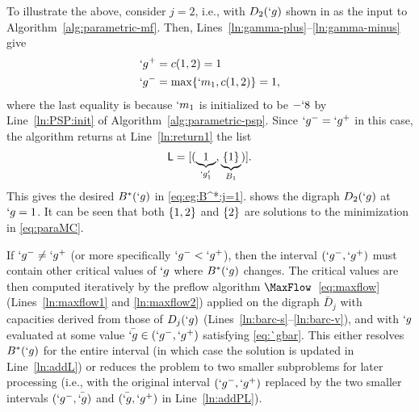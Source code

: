 \documentclass[conference,letterpaper]{IEEEtran}
\begin{document}
To illustrate the above, consider $j=2$, i.e., with $D_{2}(`g)$ shown in  as the input to
Algorithm~\ref{alg:parametric-mf}.
Then, Lines~\ref{ln:gamma-plus}--\ref{ln:gamma-minus} give
\begin{align*}
	`g^+&=c(1,2)=1\\
	`g^-&=\max\{`m_1,c(1,2)\}=1,
\end{align*} 
where the last equality is because $`m_1$ is initialized to be $-`8$ by Line~\ref{ln:PSP:init} of
Algorithm~\ref{alg:parametric-psp}.
Since $`g^-=`g^+$ in this case, the algorithm returns at Line~\ref{ln:return1} the list
\begin{align*}
	\DataSty{L}=[(\underbrace{1}_{`g'_1},\underbrace{\Set {1}}_{B_1})].
\end{align*} 
This gives the desired $B^*(`g)$ in \eqref{eq:eg:B^*:j=1}.  shows the digraph
$D_2(`g)$ at $`g=1$. It can be seen that both $\{1,2\}$ and $\{2\}$ are solutions to the
minimization in \eqref{eq:paraMC}.

If $`g^-\neq `g^+$ (or more specifically $`g^-< `g^+$), then the interval $(`g^-,`g^+)$ must contain
other critical values of $`g$ where $B^*(`g)$ changes. The critical values are then computed
iteratively by the preflow algorithm $\MaxFlow$~\eqref{eq:maxflow} (Lines~\ref{ln:maxflow1} and
\ref{ln:maxflow2}) applied on the digraph $\bar{D}_j$ with capacities derived from those of
$D_j(`g)$ (Lines~\ref{ln:barc-s}--\ref{ln:barc-v}), and with $`g$ evaluated at some value $\bar
{`g}\in (`g^-,`g^+)$ satisfying \eqref{eq:`gbar}. This either resolves $B^*(`g)$ for the entire
interval (in which case the solution is updated in Line~\ref{ln:addL}) or reduces the problem to two
smaller subproblems for later processing (i.e., with the original interval $(`g^-,`g^+)$ replaced by
the two smaller intervals $(`g^-,\bar{`g})$ and $(\bar{`g},`g^+)$ in Line~\ref{ln:addPL}). 
\end{document}
